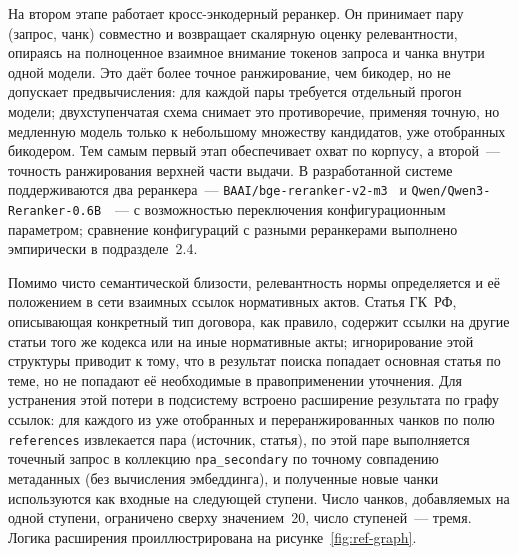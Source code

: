 На втором этапе работает кросс-энкодерный реранкер. Он принимает пару (запрос, чанк) совместно и возвращает скалярную оценку релевантности, опираясь на полноценное взаимное внимание токенов запроса и чанка внутри одной модели. Это даёт более точное ранжирование, чем бикодер, но не допускает предвычисления: для каждой пары требуется отдельный прогон модели; двухступенчатая схема снимает это противоречие, применяя точную, но медленную модель только к небольшому множеству кандидатов, уже отобранных бикодером. Тем самым первый этап обеспечивает охват по корпусу, а второй~--- точность ранжирования верхней части выдачи. В разработанной системе поддерживаются два реранкера~--- \texttt{BAAI/bge-reranker-v2-m3}~\cite{chen2024bgem3} и \texttt{Qwen/Qwen3-Reranker-0.6B}~\cite{qwen3_reranker_card}~--- с возможностью переключения конфигурационным параметром; сравнение конфигураций с разными реранкерами выполнено эмпирически в подразделе~2.4.

Помимо чисто семантической близости, релевантность нормы определяется и её положением в сети взаимных ссылок нормативных актов. Статья ГК~РФ, описывающая конкретный тип договора, как правило, содержит ссылки на другие статьи того же кодекса или на иные нормативные акты; игнорирование этой структуры приводит к тому, что в результат поиска попадает основная статья по теме, но не попадают её необходимые в правоприменении уточнения. Для устранения этой потери в подсистему встроено расширение результата по графу ссылок: для каждого из уже отобранных и переранжированных чанков по полю \texttt{references} извлекается пара (источник, статья), по этой паре выполняется точечный запрос в коллекцию \texttt{npa\_secondary} по точному совпадению метаданных (без вычисления эмбеддинга), и полученные новые чанки используются как входные на следующей ступени. Число чанков, добавляемых на одной ступени, ограничено сверху значением~20, число ступеней~--- тремя. Логика расширения проиллюстрирована на рисунке~\ref{fig:ref-graph}.

